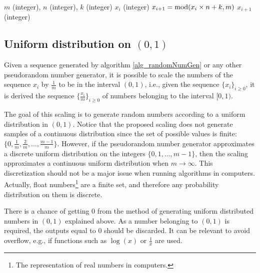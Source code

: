 \vspace{5mm}
\begin{algorithm}[H]
\SetAlgoLined
   $m$ (integer), $n$ (integer), $k$ (integer)\;
   $x_i$ (integer)\;   
  $x_{i+1} = \textup{mod}(x_i \times n + k, m)$\;
   $x_{i+1}$ (integer)
\caption[Basic linear congruential random number generator]
{
  Basic linear congruential pseudorandom number generator. A sequence is generated calling the algorithm several times. Each time the algorithm is called the input will be the output of the previous call. A seed $x_0$ is required. %
}
\label{alg_randomNumGen}
\end{algorithm}
\vspace{5mm}

\subsection{Uniform distribution on $(0,1)$} \label{sec_uniformDistribution}

Given a sequence generated by algorithm \ref{alg_randomNumGen} or any other pseudorandom number generator, it is possible to scale the numbers of the sequence $x_i$ by $\frac{1}{m}$ to be in the interval $(0,1)$, i.e., given the sequence $\{x_i\}_{i \geq 0}$, it is derived the sequence $\{ \frac{x_i}{m} \}_{i \geq 0}$ of numbers belonging to the interval $[0,1)$. 

The goal of this scaling is to generate random numbers according to a uniform distribution in $(0,1)$. Notice that the proposed scaling does not generate samples of a continuous distribution since the set of possible values is finite: $\{0, \frac{1}{m}, \frac{2}{m} , \dots, \frac{m-1}{m} \}$. However, if the pseudorandom number generator approximates a discrete uniform distribution on the integers $\{0, 1, \dots, m-1\}$, then the scaling approximates a continuous uniform distribution when $m \to \infty$. This discretization should not be a major issue when running algorithms in computers. Actually, float numbers\footnote{The representation of real numbers in computers.} are a finite set, and therefore any probability distribution on them is discrete.

\begin{remark}
There is a chance of getting $0$ from the method of generating uniform distributed numbers in $(0,1)$ explained above. As a number belonging to $(0,1)$ is required, the outputs equal to $0$ should be discarded. It can be relevant to avoid overflow, e.g., if functions such as $\log(x)$ or $\frac{1}{x}$ are used.
\end{remark}

